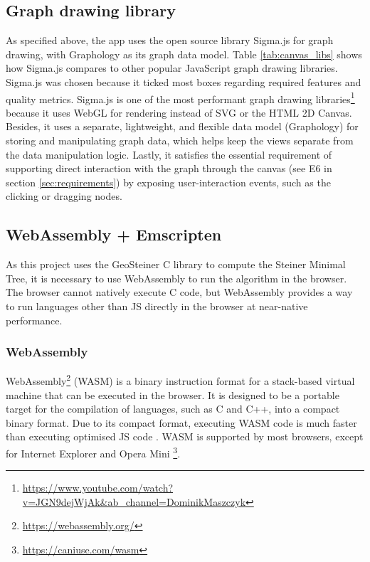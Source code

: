 \documentclass{l4proj}
\begin{document}


\subsection{Graph drawing library}
As specified above, the app uses the open source library Sigma.js for graph drawing, with Graphology as its graph data model. Table \ref{tab:canvas_libs} shows how Sigma.js compares to other popular JavaScript graph drawing libraries. Sigma.js was chosen because it ticked most boxes regarding required features and quality metrics.
Sigma.js is one of the most performant graph drawing libraries\footnote{\url{https://www.youtube.com/watch?v=JGN9dejWjAk\&ab\_channel=DominikMaszczyk}} because it uses WebGL for rendering instead of SVG or the HTML 2D Canvas. Besides, it uses a separate, lightweight, and flexible data model (Graphology) for storing and manipulating graph data, which helps keep the views separate from the data manipulation logic.
Lastly, it satisfies the essential requirement of supporting direct interaction with the graph through the canvas (see E6 in section \ref{sec:requirements}) by exposing user-interaction events, such as the clicking or dragging nodes.

\subsection{WebAssembly + Emscripten}
As this project uses the GeoSteiner C library to compute the Steiner Minimal Tree, it is necessary to use WebAssembly to run the algorithm in the browser. The browser cannot natively execute C code, but WebAssembly provides a way to run languages other than JS directly in the browser at near-native performance.
\subsubsection{WebAssembly}
WebAssembly\footnote{\url{https://webassembly.org/}} (WASM) is a binary instruction format for a stack-based virtual machine that can be executed in the browser. It is designed to be a portable target for the compilation of languages, such as C and C++, into a compact binary format.
Due to its compact format, executing WASM code is much faster than executing optimised JS code \citep{WebAssemblyIntro}.
WASM is supported by most browsers, except for Internet Explorer and Opera Mini \footnote{\url{https://caniuse.com/wasm}}.
\end{document}
